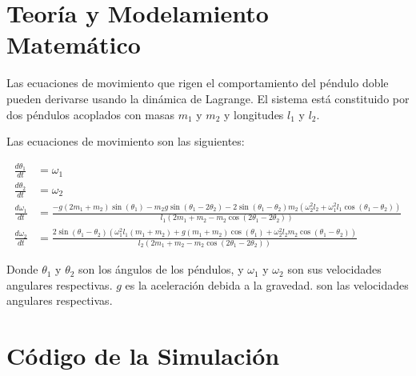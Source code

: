 \documentclass[12pt]{article}
\begin{document}
\section{Teoría y Modelamiento Matemático}
Las ecuaciones de movimiento que rigen el comportamiento del péndulo doble pueden derivarse usando la dinámica de Lagrange. El sistema está constituido por dos péndulos acoplados con masas \(m_1\) y \(m_2\) y longitudes \(l_1\) y \(l_2\).

Las ecuaciones de movimiento son las siguientes:

\[
\begin{aligned}
\frac{d\theta_1}{dt} &= \omega_1 \\
\frac{d\theta_2}{dt} &= \omega_2 \\
\frac{d\omega_1}{dt} &= \frac{-g(2m_1 + m_2)\sin(\theta_1) - m_2g \sin(\theta_1 - 2\theta_2) - 2\sin(\theta_1 - \theta_2)m_2(\omega_2^2 l_2 + \omega_1^2 l_1 \cos(\theta_1 - \theta_2))}{l_1 (2m_1 + m_2 - m_2\cos(2\theta_1 - 2\theta_2))} \\
\frac{d\omega_2}{dt} &= \frac{2\sin(\theta_1 - \theta_2)(\omega_1^2 l_1 (m_1 + m_2) + g (m_1 + m_2) \cos(\theta_1) + \omega_2^2 l_2 m_2 \cos(\theta_1 - \theta_2))}{l_2 (2m_1 + m_2 - m_2\cos(2\theta_1 - 2\theta_2))}
\end{aligned}
\]

Donde \( \theta_1 \) y \( \theta_2 \) son los ángulos de los péndulos, y \( \omega_1 \) y \( \omega_2 \) son sus velocidades angulares respectivas. \( g \) es la aceleración debida a la gravedad.
 son las velocidades angulares respectivas.
\section{Código de la Simulación}
\end{document}
